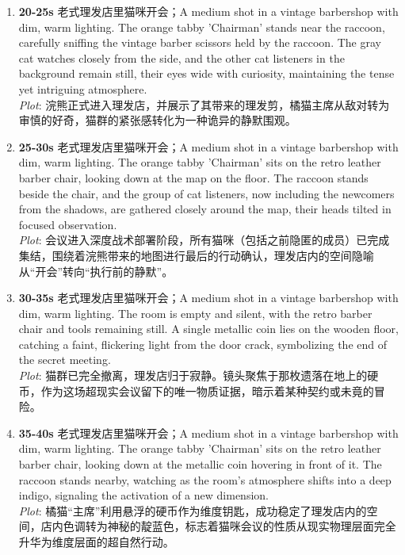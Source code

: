 \documentclass[11pt,a4paper]{article}
\begin{document}
\begin{enumerate}
\item \textbf{20-25s} 老式理发店里猫咪开会；A medium shot in a vintage barbershop with dim, warm lighting. The orange tabby 'Chairman' stands near the raccoon, carefully sniffing the vintage barber scissors held by the raccoon. The gray cat watches closely from the side, and the other cat listeners in the background remain still, their eyes wide with curiosity, maintaining the tense yet intriguing atmosphere.\\\newline \textit{Plot}: 浣熊正式进入理发店，并展示了其带来的理发剪，橘猫主席从敌对转为审慎的好奇，猫群的紧张感转化为一种诡异的静默围观。
\item \textbf{25-30s} 老式理发店里猫咪开会；A medium shot in a vintage barbershop with dim, warm lighting. The orange tabby 'Chairman' sits on the retro leather barber chair, looking down at the map on the floor. The raccoon stands beside the chair, and the group of cat listeners, now including the newcomers from the shadows, are gathered closely around the map, their heads tilted in focused observation.\\\newline \textit{Plot}: 会议进入深度战术部署阶段，所有猫咪（包括之前隐匿的成员）已完成集结，围绕着浣熊带来的地图进行最后的行动确认，理发店内的空间隐喻从“开会”转向“执行前的静默”。
\item \textbf{30-35s} 老式理发店里猫咪开会；A medium shot in a vintage barbershop with dim, warm lighting. The room is empty and silent, with the retro barber chair and tools remaining still. A single metallic coin lies on the wooden floor, catching a faint, flickering light from the door crack, symbolizing the end of the secret meeting.\\\newline \textit{Plot}: 猫群已完全撤离，理发店归于寂静。镜头聚焦于那枚遗落在地上的硬币，作为这场超现实会议留下的唯一物质证据，暗示着某种契约或未竟的冒险。
\item \textbf{35-40s} 老式理发店里猫咪开会；A medium shot in a vintage barbershop with dim, warm lighting. The orange tabby 'Chairman' sits on the retro leather barber chair, looking down at the metallic coin hovering in front of it. The raccoon stands nearby, watching as the room's atmosphere shifts into a deep indigo, signaling the activation of a new dimension.\\\newline \textit{Plot}: 橘猫“主席”利用悬浮的硬币作为维度钥匙，成功稳定了理发店内的空间，店内色调转为神秘的靛蓝色，标志着猫咪会议的性质从现实物理层面完全升华为维度层面的超自然行动。

\end{enumerate}
\end{document}
